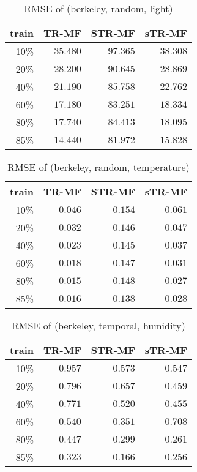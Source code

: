 \begin{table} [htbp]
\setlength{\tabcolsep}{2pt}
\centering
\caption{RMSE of (berkeley, random, light)}
\label{table:spatial_random_light}
\begin{tabular} {r | r r r}
	train	& TR-MF	&	STR-MF	&	sTR-MF	\\ \hline
	10\% & $ \mathbf{ 35.480 } $ & $ 97.365 $ & $ 38.308 $ \\
	20\% & $ \mathbf{ 28.200 } $ & $ 90.645 $ & $ 28.869 $ \\
	40\% & $ \mathbf{ 21.190 } $ & $ 85.758 $ & $ 22.762 $ \\
	60\% & $ \mathbf{ 17.180 } $ & $ 83.251 $ & $ 18.334 $ \\
	80\% & $ \mathbf{ 17.740 } $ & $ 84.413 $ & $ 18.095 $ \\
	85\% & $ \mathbf{ 14.440 } $ & $ 81.972 $ & $ 15.828 $ \\
\end{tabular}
\end{table}


\begin{table} [htbp]
\setlength{\tabcolsep}{2pt}
\centering
\caption{RMSE of (berkeley, random, temperature)}
\label{table:spatial_random_tem}
\begin{tabular} {r | r r r}
	train	& TR-MF	&	STR-MF	&	sTR-MF	\\ \hline
	10\% & $ \mathbf{ 0.046 } $ & $ 0.154 $ & $ 0.061 $ \\
	20\% & $ \mathbf{ 0.032 } $ & $ 0.146 $ & $ 0.047 $ \\
	40\% & $ \mathbf{ 0.023 } $ & $ 0.145 $ & $ 0.037 $ \\
	60\% & $ \mathbf{ 0.018 } $ & $ 0.147 $ & $ 0.031 $ \\
	80\% & $ \mathbf{ 0.015 } $ & $ 0.148 $ & $ 0.027 $ \\
	85\% & $ \mathbf{ 0.016 } $ & $ 0.138 $ & $ 0.028 $ \\
\end{tabular}
\end{table}




\begin{table} [htbp]
\setlength{\tabcolsep}{2pt}
\centering
\caption{RMSE of (berkeley, temporal, humidity)}
\label{table:spatial_temporal_hum}
\begin{tabular} {r | r r r}
	train	& TR-MF	&	STR-MF	&	sTR-MF	\\ \hline
	10\% & $ 0.957 $ & $ 0.573 $ & $ \mathbf{ 0.547 } $ \\
	20\% & $ 0.796 $ & $ 0.657 $ & $ \mathbf{ 0.459 } $ \\
	40\% & $ 0.771 $ & $ 0.520 $ & $ \mathbf{ 0.455 } $ \\
	60\% & $ 0.540 $ & $ \mathbf{ 0.351 } $ & $ 0.708 $ \\
	80\% & $ 0.447 $ & $ 0.299 $ & $ \mathbf{ 0.261 } $ \\
	85\% & $ 0.323 $ & $ \mathbf{ 0.166 } $ & $ 0.256 $ \\
\end{tabular}
\end{table}

